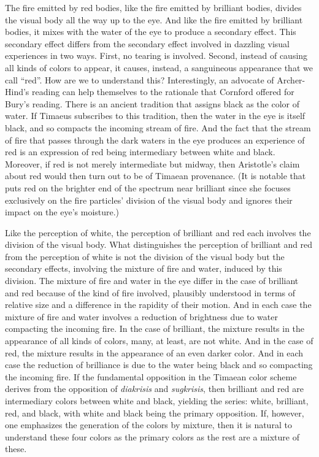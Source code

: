 The fire emitted by red bodies, like the fire emitted by brilliant bodies, divides the visual body all the way up to the eye. And like the fire emitted by brilliant bodies, it mixes with the water of the eye to produce a secondary effect. This secondary effect differs from the secondary effect involved in dazzling visual experiences in two ways. First, no tearing is involved. Second, instead of causing all kinds of colors to appear, it causes, instead, a sanguineous appearance that we call ``red''. How are we to understand this? Interestingly, an advocate of Archer-Hind's reading can help themselves to the rationale that Cornford offered for Bury's reading. There is an ancient tradition that assigns black as the color of water. If Timaeus subscribes to this tradition, then the water in the eye is itself black, and so compacts the incoming stream of fire. And the fact that the stream of fire that passes through the dark waters in the eye produces an experience of red is an expression of red being intermediary between white and black. Moreover, if red is not merely intermediate but midway, then Aristotle's claim about red would then turn out to be of Timaean provenance. (It is notable that \citealt[57]{James:1996pb} puts red on the brighter end of the spectrum near brilliant since she focuses exclusively on the fire particles' division of the visual body and ignores their impact on the eye's moisture.)

Like the perception of white, the perception of brilliant and red each involves the division of the visual body. What distinguishes the perception of brilliant and red from the perception of white is not the division of the visual body but the secondary effects, involving the mixture of fire and water, induced by this division. The mixture of fire and water in the eye differ in the case of brilliant and red because of the kind of fire involved, plausibly understood in terms of relative size and a difference in the rapidity of their motion. And in each case the mixture of fire and water involves a reduction of brightness due to water compacting the incoming fire. In the case of brilliant, the mixture results in the appearance of all kinds of colors, many, at least, are not white. And in the case of red, the mixture results in the appearance of an even darker color. And in each case the reduction of brilliance is due to the water being black and so compacting the incoming fire. If the fundamental opposition in the Timaean color scheme derives from the opposition of \emph{diakrisis} and \emph{sugkrisis}, then brilliant and red are intermediary colors between white and black, yielding the series: white, brilliant, red, and black, with white and black being the primary opposition. If, however, one emphasizes the generation of the colors by mixture, then it is natural to understand these four colors as the primary colors as the rest are a mixture of these.

